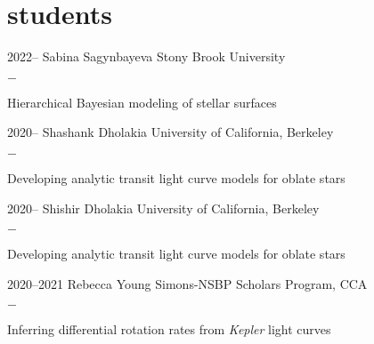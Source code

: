 \documentclass[]{luger-cv} %
\begin{document}
\section{students}
\begin{entrylist}


    \entry
    {2022--}
    {Sabina Sagynbayeva}
    {Stony Brook University}
    {%
        \vspace{-1em}
        \begin{list}{{\color{numcolor}$-$}}{\cvlist}
            \item Hierarchical Bayesian modeling of stellar surfaces
        \end{list}
    }


    \entry
    {2020--}
    {Shashank Dholakia}
    {University of California, Berkeley}
    {%
        \vspace{-1em}
        \begin{list}{{\color{numcolor}$-$}}{\cvlist}
            \item Developing analytic transit light curve models for oblate stars
        \end{list}
    }


    \entry
    {2020--}
    {Shishir Dholakia}
    {University of California, Berkeley}
    {%
        \vspace{-1em}
        \begin{list}{{\color{numcolor}$-$}}{\cvlist}
            \item Developing analytic transit light curve models for oblate stars
        \end{list}
    }


    \entry
    {2020--2021}
    {Rebecca Young}
    {Simons-NSBP Scholars Program, CCA}
    {%
        \vspace{-1em}
        \begin{list}{{\color{numcolor}$-$}}{\cvlist}
            \item Inferring differential rotation rates from \emph{Kepler} light curves
        \end{list}
    }



\end{entrylist}
\end{document}
